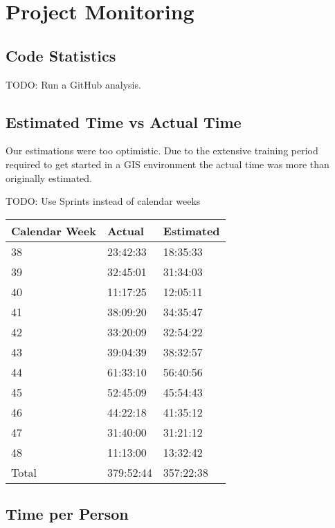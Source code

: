 \chapter{Project Monitoring}\label{project monitoring}

\section{Code Statistics}

TODO: Run a GitHub analysis.


\section{Estimated Time vs Actual Time}

Our estimations were too optimistic. Due to the extensive
training period required to get started in a GIS environment
the actual time was more than originally estimated.

TODO: Use Sprints instead of calendar weeks

\begin{center}
    \begin{tabular}{lll}
    \hline
    Calendar Week & Actual & Estimated    \\
    \hline
    38     & 23:42:33         & 18:35:33          \\
    39     & 32:45:01         & 31:34:03          \\
    40     & 11:17:25         & 12:05:11          \\
    41     & 38:09:20         & 34:35:47          \\
    42     & 33:20:09         & 32:54:22          \\
    43     & 39:04:39         & 38:32:57          \\
    44     & 61:33:10         & 56:40:56          \\
    45     & 52:45:09         & 45:54:43          \\
    46     & 44:22:18         & 41:35:12          \\
    47     & 31:40:00         & 31:21:12          \\
    48     & 11:13:00         & 13:32:42          \\
    \hline
    Total & 379:52:44        & 357:22:38         \\
    \end{tabular}
\end{center}

\section{Time per Person}

